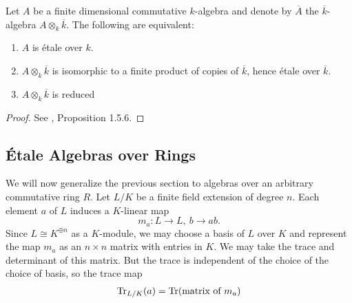 \begin{theorem}
	Let $A$ be a finite dimensional commutative $k$-algebra and denote by $\overline{A}$ the $\overline{k}$-algebra $A \otimes_k \overline{k}$. The following are equivalent:
	\begin{enumerate}
		\item $A$ is \'etale over $k$.\label{etale}
		\item $A \otimes_k \overline{k}$ is isomorphic to a finite product of copies of $\overline{k}$, hence \'etale over $\overline{k}$.\label{product}
		\item $A \otimes_k \overline{k}$ is reduced
	\end{enumerate}
\end{theorem}

\begin{proof}
	See \cite{Szamuely}, Proposition 1.5.6.
\end{proof}

\subsection{\'Etale Algebras over Rings}
We will now generalize the previous section to algebras over an arbitrary commutative ring $R$. Let $L/K$ be a finite field extension of degree $n$. Each element $a$ of $L$ induces a $K$-linear map
\[
	m_a: L \to L,\ b \to ab.
\]
Since $L \cong K^{\oplus n}$ as a $K$-module, we may choose a basis of $L$ over $K$ and represent the map $m_a$ as an $n \times n$ matrix with entries in $K$. We may take the trace and determinant of this matrix. But the trace is independent of the choice of the choice of basis, so the trace map
\begin{gather*}
	\operatorname{Tr}_{L/K}(a) = \operatorname{Tr}(\text{matrix of }m_a)
\end{gather*}

